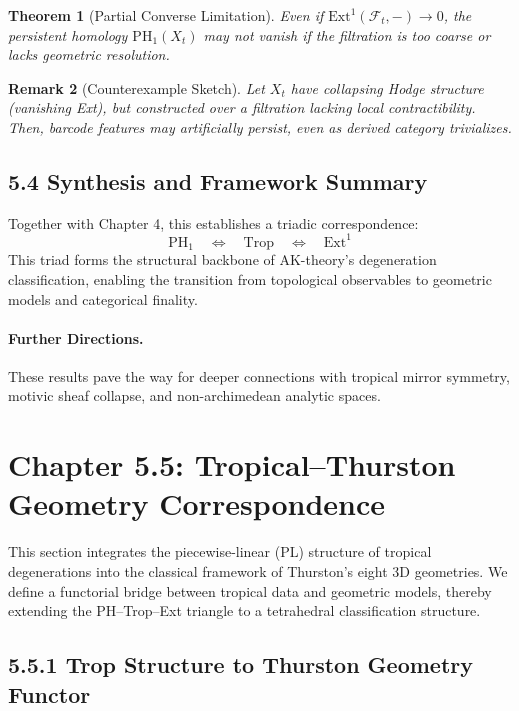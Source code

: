 \documentclass[11pt]{article}
\newtheorem{theorem}{Theorem}[section]
\newtheorem{remark}[theorem]{Remark}
\begin{document}
\begin{theorem}[Partial Converse Limitation]
Even if $\mathrm{Ext}^1(\mathcal{F}_t, -) \to 0$, the persistent homology $\mathrm{PH}_1(X_t)$ may not vanish if the filtration is too coarse or lacks geometric resolution.
\end{theorem}

\begin{remark}[Counterexample Sketch]
Let $X_t$ have collapsing Hodge structure (vanishing Ext), but constructed over a filtration lacking local contractibility. Then, barcode features may artificially persist, even as derived category trivializes.
\end{remark}

\subsection{5.4 Synthesis and Framework Summary}

Together with Chapter 4, this establishes a triadic correspondence:
\[
\mathrm{PH}_1 \quad \Longleftrightarrow \quad \mathrm{Trop} \quad \Longleftrightarrow \quad \mathrm{Ext}^1
\]
This triad forms the structural backbone of AK-theory’s degeneration classification, enabling the transition from topological observables to geometric models and categorical finality.

\paragraph{Further Directions.}
These results pave the way for deeper connections with tropical mirror symmetry, motivic sheaf collapse, and non-archimedean analytic spaces.

\section{Chapter 5.5: Tropical–Thurston Geometry Correspondence}
\label{sec:thurston}

This section integrates the piecewise-linear (PL) structure of tropical degenerations into the classical framework of Thurston’s eight 3D geometries. We define a functorial bridge between tropical data and geometric models, thereby extending the PH–Trop–Ext triangle to a tetrahedral classification structure.

\subsection{5.5.1 Trop Structure to Thurston Geometry Functor}
\end{document}
